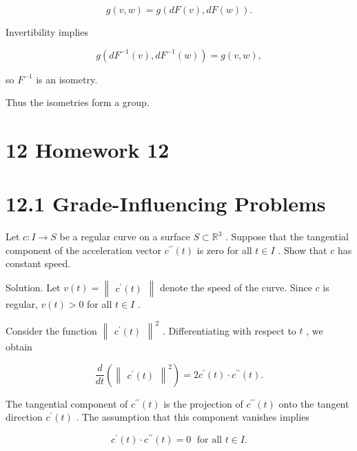 \documentclass[10pt]{article}
\begin{document}
\[
g\left( {v,w}\right)  = g\left( {{dF}\left( v\right) ,{dF}\left( w\right) }\right) .
\]

Invertibility implies

\[
g\left( {d{F}^{-1}\left( v\right) ,d{F}^{-1}\left( w\right) }\right)  = g\left( {v,w}\right) ,
\]

so \({F}^{-1}\) is an isometry.

Thus the isometries form a group.

\section*{12 Homework 12}

\section*{12.1 Grade-Influencing Problems}

\begin{problem}[title=PROBLEM 1 (4 POINTS)]
Let \(c : I \rightarrow  S\) be a regular curve on a surface \(S \subset  {\mathbb{R}}^{3}\) . Suppose that the tangential component of the acceleration vector \({c}^{\prime \prime }\left( t\right)\) is zero for all \(t \in  I\) . Show that \(c\) has constant speed.
\end{problem}

Solution. Let \(v\left( t\right)  = \begin{Vmatrix}{{c}^{\prime }\left( t\right) }\end{Vmatrix}\) denote the speed of the curve. Since \(c\) is regular, \(v\left( t\right)  > 0\) for all \(t \in  I\) .

Consider the function \({\begin{Vmatrix}{c}^{\prime }\left( t\right) \end{Vmatrix}}^{2}\) . Differentiating with respect to \(t\) , we obtain

\[
\frac{d}{dt}\left( {\begin{Vmatrix}{c}^{\prime }\left( t\right) \end{Vmatrix}}^{2}\right)  = 2{c}^{\prime }\left( t\right)  \cdot  {c}^{\prime \prime }\left( t\right) .
\]

The tangential component of \({c}^{\prime \prime }\left( t\right)\) is the projection of \({c}^{\prime \prime }\left( t\right)\) onto the tangent direction \({c}^{\prime }\left( t\right)\) . The assumption that this component vanishes implies

\[
{c}^{\prime }\left( t\right)  \cdot  {c}^{\prime \prime }\left( t\right)  = 0\;\text{ for all }t \in  I.
\]
\end{document}
